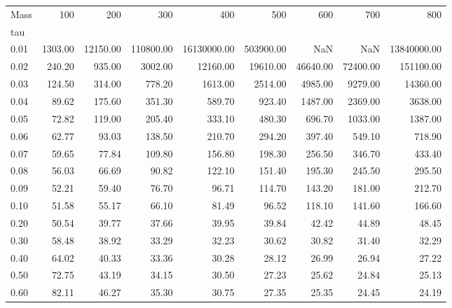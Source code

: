 \begin{tabular}{lrrrrrrrr}
\toprule
Mass &      100 &       200 &        300 &          400 &        500 &       600 &       700 &          800 \\
tau   &          &           &            &              &            &           &           &              \\
\midrule
0.01  &  1303.00 &  12150.00 &  110800.00 &  16130000.00 &  503900.00 &       NaN &       NaN &  13840000.00 \\
0.02  &   240.20 &    935.00 &    3002.00 &     12160.00 &   19610.00 &  46640.00 &  72400.00 &    151100.00 \\
0.03  &   124.50 &    314.00 &     778.20 &      1613.00 &    2514.00 &   4985.00 &   9279.00 &     14360.00 \\
0.04  &    89.62 &    175.60 &     351.30 &       589.70 &     923.40 &   1487.00 &   2369.00 &      3638.00 \\
0.05  &    72.82 &    119.00 &     205.40 &       333.10 &     480.30 &    696.70 &   1033.00 &      1387.00 \\
0.06  &    62.77 &     93.03 &     138.50 &       210.70 &     294.20 &    397.40 &    549.10 &       718.90 \\
0.07  &    59.65 &     77.84 &     109.80 &       156.80 &     198.30 &    256.50 &    346.70 &       433.40 \\
0.08  &    56.03 &     66.69 &      90.82 &       122.10 &     151.40 &    195.30 &    245.50 &       295.50 \\
0.09  &    52.21 &     59.40 &      76.70 &        96.71 &     114.70 &    143.20 &    181.00 &       212.70 \\
0.10  &    51.58 &     55.17 &      66.10 &        81.49 &      96.52 &    118.10 &    141.60 &       166.60 \\
0.20  &    50.54 &     39.77 &      37.66 &        39.95 &      39.84 &     42.42 &     44.89 &        48.45 \\
0.30  &    58.48 &     38.92 &      33.29 &        32.23 &      30.62 &     30.82 &     31.40 &        32.29 \\
0.40  &    64.02 &     40.33 &      33.36 &        30.28 &      28.12 &     26.99 &     26.94 &        27.22 \\
0.50  &    72.75 &     43.19 &      34.15 &        30.50 &      27.23 &     25.62 &     24.84 &        25.13 \\
0.60  &    82.11 &     46.27 &      35.30 &        30.75 &      27.35 &     25.35 &     24.45 &        24.19 \\

\end{tabular}
